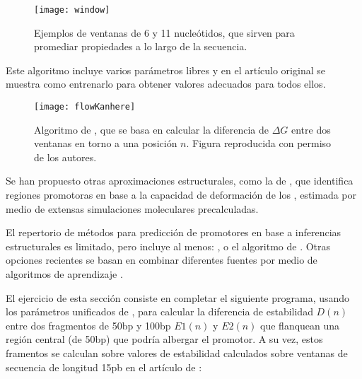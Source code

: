 \begin{figure}
\begin{center} 
\texttt{[image: window]}
\caption
{
Ejemplos de ventanas de 6 y 11 nucle\'{o}tidos, que sirven para promediar propiedades a lo largo de la secuencia.
}
\label{fig:window}
\end{center}
\end{figure}

Este algoritmo incluye varios par\'{a}metros libres y en el art\'{i}culo original se muestra como entrenarlo para obtener valores adecuados para todos ellos.

\begin{figure}
\begin{center} 
\texttt{[image: flowKanhere]}
\caption
{
Algoritmo de \cite{Kanhere2005}, que se basa en calcular la diferencia de $\Delta G$ entre dos ventanas en torno a una posici\'{o}n $n$.
Figura reproducida con permiso de los autores.
}
\label{fig:Kanhere}
\end{center}
\end{figure}

Se han propuesto otras aproximaciones estructurales, como la de \cite{Gogni2007}, %
que identifica regiones promotoras en base a la capacidad de deformaci\'{o}n de los 
,
estimada por medio de extensas simulaciones moleculares precalculadas. 

El repertorio de m\'{e}todos para predicci\'{o}n de promotores en base a inferencias estructurales es limitado, pero incluye al menos: 
, 
o el algoritmo de \citet{Song2012}. Otras opciones recientes se basan en combinar diferentes fuentes por medio de algoritmos de aprendizaje \citep{Eser2016}.

El ejercicio de esta secci\'{o}n consiste en completar el siguiente programa, usando los par\'{a}metros unificados de \cite{SantaLucia1998},
para calcular la diferencia de estabilidad $D(n)$ entre dos fragmentos de 50bp y 100bp $E1(n)$ y $E2(n)$ 
que flanquean una regi\'{o}n central (de 50bp) que podr\'{i}a albergar el promotor.
A su vez, estos framentos se calculan sobre valores de estabilidad calculados sobre ventanas de secuencia 
de longitud 15pb en el art\'{i}culo de \cite{Kanhere2005}:

